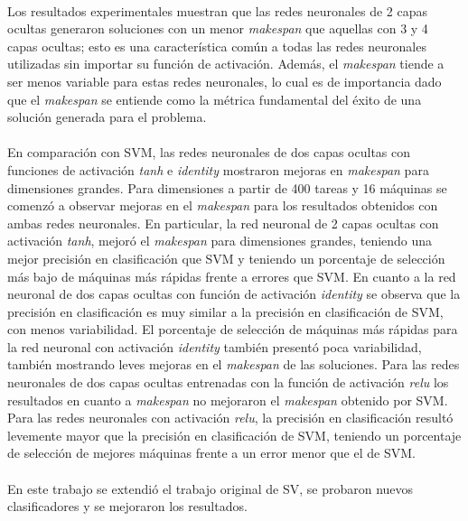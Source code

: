 \paragraph{}Los resultados experimentales muestran que las redes neuronales de 2 capas ocultas generaron soluciones con un menor \textit{makespan} que aquellas con 3 y 4 capas ocultas; esto es una característica común a todas las redes neuronales utilizadas sin importar su función de activación.
Además, el \textit{makespan} tiende a ser menos variable para estas redes neuronales, lo cual es de importancia dado que el \textit{makespan} se entiende como la métrica fundamental del éxito de una solución generada para el problema.

\paragraph{}En comparación con SVM, las redes neuronales de dos capas ocultas con funciones de activación \textit{tanh} e \textit{identity} mostraron mejoras en \textit{makespan} para dimensiones grandes.
Para dimensiones a partir de 400 tareas y 16 máquinas se comenzó a observar mejoras en el \textit{makespan} para los resultados obtenidos con ambas redes neuronales.
En particular, la red neuronal de 2 capas ocultas con activación \textit{tanh}, mejoró el \textit{makespan} para dimensiones grandes, teniendo una mejor precisión en clasificación que SVM y teniendo un porcentaje de selección más bajo de máquinas más rápidas frente a errores que SVM.
En cuanto a la red neuronal de dos capas ocultas con función de activación \textit{identity} se observa que la precisión en clasificación es muy similar a la precisión en clasificación de SVM, con menos variabilidad. El porcentaje de selección de máquinas más rápidas para la red neuronal con activación \textit{identity} también presentó poca variabilidad, también mostrando leves mejoras en el \textit{makespan} de las soluciones.
Para las redes neuronales de dos capas ocultas entrenadas con la función de activación \textit{relu} los resultados en cuanto a \textit{makespan} no mejoraron el \textit{makespan} obtenido por SVM. Para las redes neuronales con activación \textit{relu}, la precisión en clasificación resultó levemente mayor que la precisión en clasificación de SVM, teniendo un porcentaje de selección de mejores máquinas frente a un error menor que el de SVM.

\paragraph{}En este trabajo se extendió el trabajo original de SV, se probaron nuevos clasificadores y se mejoraron los resultados.

